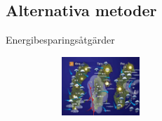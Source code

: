 \subsection{Alternativa metoder}

\begin{frame}{Energibesparingsåtgärder}

\begin{figure}[hpbt]
\begin{subfigure}{0.45\textwidth}
\flushright
	\includegraphics[width=111px]{images/prognos.eps}
\end{subfigure}

\end{figure}
\end{frame}
